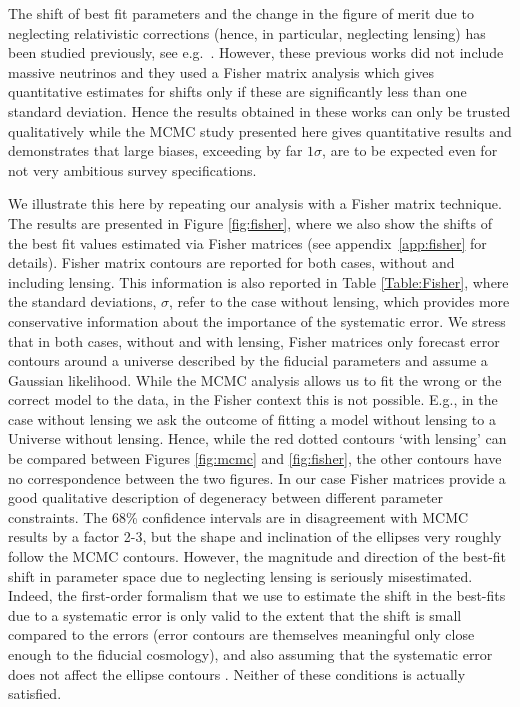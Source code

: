 The shift of best fit parameters  and the change in the figure of merit due to neglecting relativistic corrections (hence, in particular, neglecting lensing) has been studied previously, see e.g.~\cite{Namikawa:2011yr,Duncan:2013haa,Camera:2014sba,Raccanelli:2015vla}. However, these previous works did not include massive neutrinos and they used a Fisher matrix analysis which gives quantitative estimates for shifts only if these are significantly less than one standard deviation.
Hence the results obtained in these works can only be trusted qualitatively while the MCMC study presented here gives quantitative results and demonstrates that large biases, exceeding by far $1\sigma$, are to be expected even for not very ambitious survey specifications.

We illustrate this here by repeating our analysis with a Fisher matrix technique.
The results are presented in Figure \ref{fig:fisher}, where we also show the shifts of the best fit values estimated via Fisher matrices (see appendix~\ref{app:fisher} for details).
  Fisher matrix contours are reported for both cases, without and including lensing.
  This information is also reported in Table \ref{Table:Fisher}, where the standard deviations, $\sigma$, refer to the case without lensing, which provides more conservative information about the importance of the systematic error.
  We stress that in both cases, without and with lensing, Fisher matrices only forecast error contours around a universe described by the fiducial parameters and assume a Gaussian likelihood.
  While the MCMC analysis allows us to fit the wrong or the correct model to the data, in the Fisher context this is not possible.
  E.g., in the case without lensing we ask the outcome of fitting a model without lensing to a Universe without lensing.
  Hence, while the red dotted contours `with lensing' can be compared between Figures \ref{fig:mcmc} and \ref{fig:fisher}, the other contours have no correspondence between the two figures.
  In our case Fisher matrices provide a good qualitative description of degeneracy between different parameter constraints. The 68\% confidence intervals are in disagreement with MCMC results by a factor 2-3, but the shape and inclination of the ellipses very roughly follow the MCMC contours.
  However, the magnitude and direction of the best-fit shift in parameter space due to neglecting lensing is seriously misestimated.
  Indeed, the first-order formalism that we use to estimate the shift in the best-fits due to a systematic error is only valid to the extent that the shift is small compared to the errors (error contours are themselves meaningful only close enough to the fiducial cosmology), and also assuming that the systematic error does not affect the ellipse contours \cite{Kitching:2008eq}.
  Neither of these conditions is actually satisfied.

